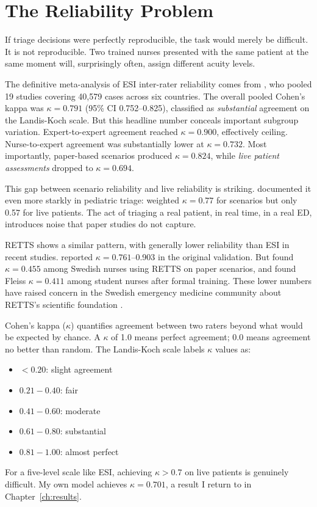 \section{The Reliability Problem}

If triage decisions were perfectly reproducible, the task would merely be difficult. It is not reproducible. Two trained nurses presented with the same patient at the same moment will, surprisingly often, assign different acuity levels.

The definitive meta-analysis of ESI inter-rater reliability comes from \citet{mirhaghi2015esi}, who pooled 19 studies covering 40,579 cases across six countries. The overall pooled Cohen's kappa was $\kappa = 0.791$ (95\% CI 0.752--0.825), classified as \emph{substantial} agreement on the Landis-Koch scale. But this headline number conceals important subgroup variation. Expert-to-expert agreement reached $\kappa = 0.900$, effectively ceiling. Nurse-to-expert agreement was substantially lower at $\kappa = 0.732$. Most importantly, paper-based scenarios produced $\kappa = 0.824$, while \emph{live patient assessments} dropped to $\kappa = 0.694$.

This gap between scenario reliability and live reliability is striking. \citet{travers2009triage} documented it even more starkly in pediatric triage: weighted $\kappa = 0.77$ for scenarios but only 0.57 for live patients. The act of triaging a real patient, in real time, in a real ED, introduces noise that paper studies do not capture.

RETTS shows a similar pattern, with generally lower reliability than ESI in recent studies. \citet{widgren2011metts} reported $\kappa = 0.761$--0.903 in the original validation. But \citet{wireklint2018reliability} found $\kappa = 0.455$ among Swedish nurses using RETTS on paper scenarios, and \citet{olsson2022educational} found Fleiss $\kappa = 0.411$ among student nurses after formal training. These lower numbers have raised concern in the Swedish emergency medicine community about RETTS's scientific foundation \citep{sbu2010triage}.

\begin{notebox}
Cohen's kappa ($\kappa$) quantifies agreement between two raters beyond what would be expected by chance. A $\kappa$ of 1.0 means perfect agreement; 0.0 means agreement no better than random. The Landis-Koch scale labels $\kappa$ values as:

\begin{itemize}[leftmargin=2em, itemsep=0.1em]
 \item $< 0.20$: slight agreement
 \item $0.21 - 0.40$: fair
 \item $0.41 - 0.60$: moderate
 \item $0.61 - 0.80$: substantial
 \item $0.81 - 1.00$: almost perfect
\end{itemize}

For a five-level scale like ESI, achieving $\kappa > 0.7$ on live patients is genuinely difficult. My own model achieves $\kappa = 0.701$, a result I return to in Chapter~\ref{ch:results}.
\end{notebox}

